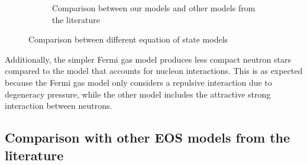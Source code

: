 \documentclass[draft,11pt]{article}
\theoremstyle{definition}
\theoremstyle{remark}
\begin{document}
\begin{figure}[h]
\begin{center}
\begin{subfigure}[b]{.49\textwidth}
                    \caption{Comparison between our models and other models from the literature}\label{fig/comparison.paper}
                \end{subfigure}
                \caption{Comparison between different equation of state models}
            \end{center}\end{figure}
            
            Additionally, the simpler Fermi gas model produces less compact neutron stars compared to the model that accounts for nucleon interactions. This is as expected because the Fermi gas model only considers a repulsive interaction due to degeneracy pressure, while the other model includes the attractive strong interaction between neutrons.
        
        \subsection{Comparison with other EOS models from the literature}
            
        
\end{document}
